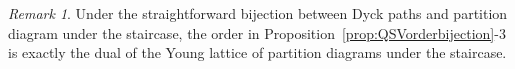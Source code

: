 \documentclass[12pt]{amsart}
\newtheorem{prop}[equation]{Proposition}
\theoremstyle{definition}
\theoremstyle{remark}
\newtheorem{rem}[equation]{Remark}
\numberwithin{equation}{section}
\newcommand{\QSV}{\mathrm{QSV}}
\newcommand{\NCP}{\mathrm{NCP}}
\newcommand{\edge}[2]{\tikz[scale = 0.75, baseline = -0.2cm]{
\draw (0.1, 0) node[inner sep = 0ex] (a) {};
\node[left, xshift = 0.1cm, yshift = -0.1cm] at (a) {$\scriptstyle #1$};
\draw (0.9, 0)  node[inner sep = 0ex] (b) {};
\node[right, xshift = -0.1cm, yshift = -0.1cm] at (b) {$\scriptstyle #2$};
\draw[thick] (a) to[out = 35, in = 145] (b);}}
\begin{document}
\begin{rem}
Under the straightforward bijection between Dyck paths and partition diagram under the staircase, the order in Proposition~\ref{prop:QSVorderbijection}-3 is exactly the dual of the Young lattice 
of partition diagrams under the staircase.
\end{rem}
%
%
%
%
%
%
%
%
%
%
%
%
%
%
\end{document}
